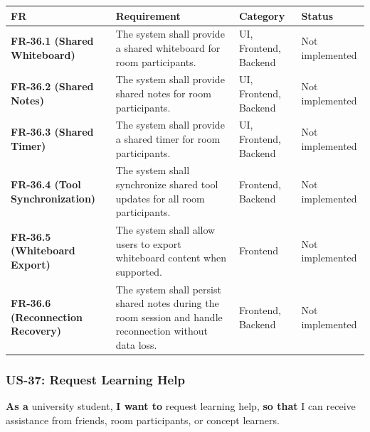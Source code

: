 \documentclass[12pt]{article}
\renewcommand{\baselinestretch}{1.5}
\begin{document}
\begingroup
\small
\renewcommand{\baselinestretch}{1.0}\selectfont
\renewcommand{\arraystretch}{1.15}
\setlength{\tabcolsep}{6pt}
\begin{longtable}{|>{\raggedright\arraybackslash}p{}|>{\raggedright\arraybackslash}p{}|>{\raggedright\arraybackslash}p{}|>{\raggedright\arraybackslash}p{}|}
\hline
\textbf{FR} & \textbf{Requirement} & \textbf{Category} & \textbf{Status} \\ \hline
\endhead
\textbf{FR-36.1 (Shared Whiteboard)} & The system shall provide a shared whiteboard for room participants. & UI, Frontend, Backend & Not implemented \\ \hline
\textbf{FR-36.2 (Shared Notes)} & The system shall provide shared notes for room participants. & UI, Frontend, Backend & Not implemented \\ \hline
\textbf{FR-36.3 (Shared Timer)} & The system shall provide a shared timer for room participants. & UI, Frontend, Backend & Not implemented \\ \hline
\textbf{FR-36.4 (Tool Synchronization)} & The system shall synchronize shared tool updates for all room participants. & Frontend, Backend & Not implemented \\ \hline
\textbf{FR-36.5 (Whiteboard Export)} & The system shall allow users to export whiteboard content when supported. & Frontend & Not implemented \\ \hline
\textbf{FR-36.6 (Reconnection Recovery)} & The system shall persist shared notes during the room session and handle reconnection without data loss. & Frontend, Backend & Not implemented \\ \hline
\end{longtable}
\endgroup
\par\medskip

\hypertarget{sec:us-37-request-learning-help}{}
\subsubsection*{US-37: Request Learning Help}
\par\medskip

\textbf{As a} university student, \textbf{I want to} request learning help, \textbf{so that} I can receive assistance from friends, room participants, or concept learners.
\par\medskip
\end{document}
